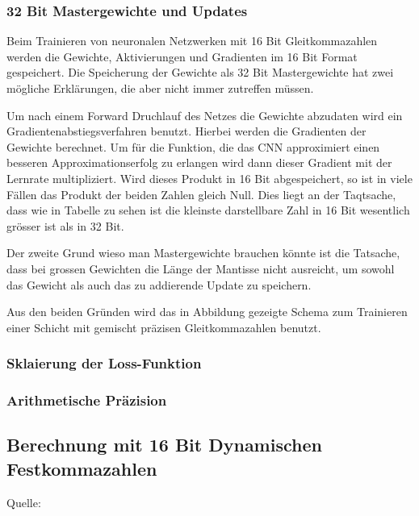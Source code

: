 \subsubsection{32 Bit Mastergewichte und Updates}

Beim Trainieren von neuronalen Netzwerken mit 16 Bit Gleitkommazahlen werden die Gewichte, Aktivierungen und Gradienten im 16 Bit Format gespeichert. Die Speicherung der Gewichte als 32 Bit Mastergewichte hat zwei mögliche Erklärungen, die aber nicht immer zutreffen müssen. 

Um nach einem Forward Druchlauf des Netzes die Gewichte abzudaten wird ein Gradientenabstiegsverfahren benutzt. Hierbei werden die Gradienten der Gewichte berechnet. Um für die Funktion, die das CNN approximiert einen besseren Approximationserfolg zu erlangen wird dann dieser Gradient mit der Lernrate multipliziert. Wird dieses Produkt in 16 Bit abgespeichert, so ist in viele Fällen das Produkt der beiden Zahlen gleich Null. Dies liegt an der Taqtsache, dass wie in Tabelle  zu sehen ist die kleinste darstellbare Zahl in 16 Bit wesentlich grösser ist als in 32 Bit.


Der zweite Grund wieso man Mastergewichte brauchen könnte ist die Tatsache, dass bei grossen Gewichten die Länge der Mantisse nicht ausreicht, um sowohl das Gewicht als auch das zu  addierende Update zu speichern.

Aus den beiden Gründen wird das in Abbildung  gezeigte Schema zum Trainieren einer Schicht mit gemischt präzisen Gleitkommazahlen benutzt.


\subsubsection{Sklaierung der Loss-Funktion}

\subsubsection{Arithmetische Präzision}


\subsection{Berechnung mit 16 Bit Dynamischen Festkommazahlen}


Quelle: \cite{FPGpu}
